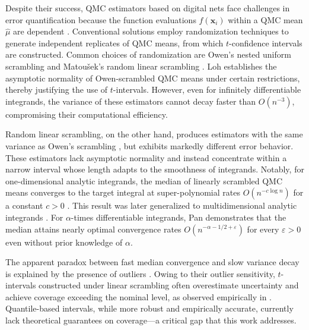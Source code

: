\documentclass{article}
\theoremstyle{definition}
\newcommand{\bsx}{\boldsymbol{x}}
\begin{document}
Despite their success, QMC estimators based on digital nets face challenges in error quantification because the function evaluations $f(\bsx_i)$ within a QMC mean $\hat\mu$ are dependent \cite{owen2025errorestimationquasimontecarlo}. Conventional solutions employ randomization techniques to generate independent replicates of QMC means, from which $t$-confidence intervals are constructed. Common choices of randomization are Owen’s nested uniform scrambling \cite{rtms} and Matou\v{s}ek’s random linear scrambling \cite{mato:1998:2}. Loh \cite{loh:2003} establishes the asymptotic normality of Owen-scrambled QMC means under certain restrictions, thereby justifying the use of $t$-intervals. However, even for infinitely differentiable integrands, the variance of these estimators cannot decay faster than $O(n^{-3})$, compromising their computational efficiency.

Random linear scrambling, on the other hand, produces estimators with the same variance as Owen's scrambling \cite{wiart2021dependence}, but exhibits markedly different error behavior. These estimators lack asymptotic normality and instead concentrate within a narrow interval whose length adapts to the smoothness of integrands. Notably, for one-dimensional analytic integrands, the median of linearly scrambled QMC means converges to the target integral at super-polynomial rates $O(n^{-c\log n})$ for a constant $c>0$ \cite{superpolyone}. This result was later generalized to multidimensional analytic integrands \cite{superpolymulti}. For $\alpha$-times differentiable integrands, Pan \cite{pan2024automatic} demonstrates that the median attains nearly optimal convergence rates $O(n^{-\alpha-1/2+\varepsilon})$ for every $\varepsilon>0$ even without prior knowledge of $\alpha$. 

The apparent paradox between fast median convergence and slow variance decay is explained by the presence of outliers \cite[Section 3]{superpolyone}. Owing to their outlier sensitivity, $t$-intervals constructed under linear scrambling often overestimate uncertainty and achieve coverage exceeding the nominal level, as observed empirically in \cite{ci4rqmc}. Quantile-based intervals, while more robust and empirically accurate, currently lack theoretical guarantees on coverage—a critical gap that this work addresses. 
 
\end{document}
